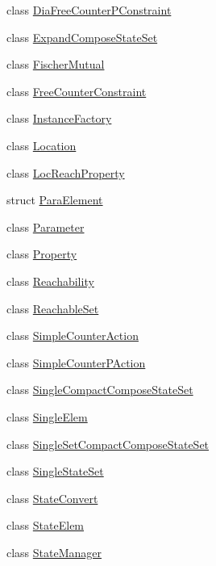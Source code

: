 \begin{DoxyCompactItemize}
class \mbox{\hyperlink{classgraphsat_1_1_dia_free_counter_p_constraint}{Dia\+Free\+Counter\+P\+Constraint}}
\item 
class \mbox{\hyperlink{classgraphsat_1_1_expand_compose_state_set}{Expand\+Compose\+State\+Set}}
\item 
class \mbox{\hyperlink{classgraphsat_1_1_fischer_mutual}{Fischer\+Mutual}}
\item 
class \mbox{\hyperlink{classgraphsat_1_1_free_counter_constraint}{Free\+Counter\+Constraint}}
\item 
class \mbox{\hyperlink{classgraphsat_1_1_instance_factory}{Instance\+Factory}}
\item 
class \mbox{\hyperlink{classgraphsat_1_1_location}{Location}}
\item 
class \mbox{\hyperlink{classgraphsat_1_1_loc_reach_property}{Loc\+Reach\+Property}}
\item 
struct \mbox{\hyperlink{structgraphsat_1_1_para_element}{Para\+Element}}
\item 
class \mbox{\hyperlink{classgraphsat_1_1_parameter}{Parameter}}
\item 
class \mbox{\hyperlink{classgraphsat_1_1_property}{Property}}
\item 
class \mbox{\hyperlink{classgraphsat_1_1_reachability}{Reachability}}
\item 
class \mbox{\hyperlink{classgraphsat_1_1_reachable_set}{Reachable\+Set}}
\item 
class \mbox{\hyperlink{classgraphsat_1_1_simple_counter_action}{Simple\+Counter\+Action}}
\item 
class \mbox{\hyperlink{classgraphsat_1_1_simple_counter_p_action}{Simple\+Counter\+P\+Action}}
\item 
class \mbox{\hyperlink{classgraphsat_1_1_single_compact_compose_state_set}{Single\+Compact\+Compose\+State\+Set}}
\item 
class \mbox{\hyperlink{classgraphsat_1_1_single_elem}{Single\+Elem}}
\item 
class \mbox{\hyperlink{classgraphsat_1_1_single_set_compact_compose_state_set}{Single\+Set\+Compact\+Compose\+State\+Set}}
\item 
class \mbox{\hyperlink{classgraphsat_1_1_single_state_set}{Single\+State\+Set}}
\item 
class \mbox{\hyperlink{classgraphsat_1_1_state_convert}{State\+Convert}}
\item 
class \mbox{\hyperlink{classgraphsat_1_1_state_elem}{State\+Elem}}
\item 
class \mbox{\hyperlink{classgraphsat_1_1_state_manager}{State\+Manager}}

\end{DoxyCompactItemize}
